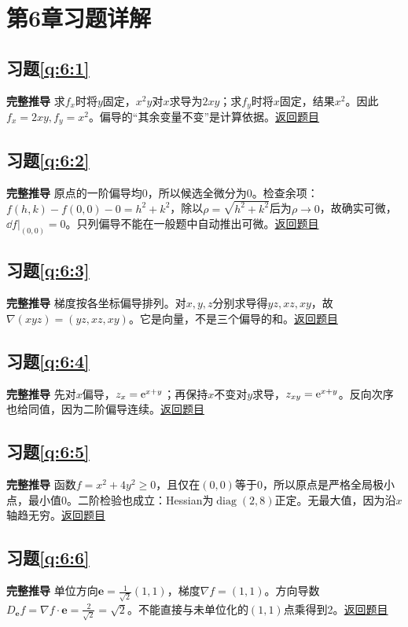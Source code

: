 \section{第6章习题详解}

\subsection*{习题\ref{q:6:1}}\label{a:6:1}\textbf{完整推导} 求$f_x$时将$y$固定，$x^2y$对$x$求导为$2xy$；求$f_y$时将$x$固定，结果$x^2$。因此$f_x=2xy,f_y=x^2$。偏导的“其余变量不变”是计算依据。\quad\hyperref[q:6:1]{返回题目}

\subsection*{习题\ref{q:6:2}}\label{a:6:2}\textbf{完整推导} 原点的一阶偏导均0，所以候选全微分为0。检查余项：$f(h,k)-f(0,0)-0=h^2+k^2$，除以$\rho=\sqrt{h^2+k^2}$后为$\rho\to0$，故确实可微，$\dd f|_{(0,0)}=0$。只列偏导不能在一般题中自动推出可微。\quad\hyperref[q:6:2]{返回题目}

\subsection*{习题\ref{q:6:3}}\label{a:6:3}\textbf{完整推导} 梯度按各坐标偏导排列。对$x,y,z$分别求导得$yz,xz,xy$，故$\nabla(xyz)=(yz,xz,xy)$。它是向量，不是三个偏导的和。\quad\hyperref[q:6:3]{返回题目}

\subsection*{习题\ref{q:6:4}}\label{a:6:4}\textbf{完整推导} 先对$x$偏导，$z_x=\mathrm{e}^{x+y}$；再保持$x$不变对$y$求导，$z_{xy}=\mathrm{e}^{x+y}$。反向次序也给同值，因为二阶偏导连续。\quad\hyperref[q:6:4]{返回题目}

\subsection*{习题\ref{q:6:5}}\label{a:6:5}\textbf{完整推导} 函数$f=x^2+4y^2\ge0$，且仅在$(0,0)$等于0，所以原点是严格全局极小点，最小值0。二阶检验也成立：Hessian为$\operatorname{diag}(2,8)$正定。无最大值，因为沿$x$轴趋无穷。\quad\hyperref[q:6:5]{返回题目}

\subsection*{习题\ref{q:6:6}}\label{a:6:6}\textbf{完整推导} 单位方向$\bm e=\frac{1}{\sqrt2}(1,1)$，梯度$\nabla f=(1,1)$。方向导数$D_{\bm e}f=\nabla f\cdot\bm e=\frac{2}{\sqrt2}=\sqrt2$。不能直接与未单位化的$(1,1)$点乘得到2。\quad\hyperref[q:6:6]{返回题目}


